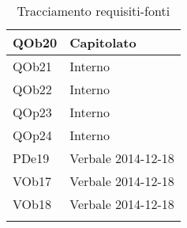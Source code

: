 \begin{longtable}{|l|p{4cm}|}
\hline
QOb20 & Capitolato \linebreak \\ 
\hline
QOb21 & Interno \linebreak \\ 
\hline
QOb22 & Interno \linebreak \\ 
\hline
QOp23 & Interno \linebreak \\ 
\hline
QOp24 & Interno \linebreak \\ 
\hline
PDe19 & Verbale 2014-12-18 \linebreak \\ 
\hline
VOb17 & Verbale 2014-12-18 \linebreak \\ 
\hline
VOb18 & Verbale 2014-12-18 \linebreak \\ 
\hline
\caption{Tracciamento requisiti-fonti}
\end{longtable}

\newpage
